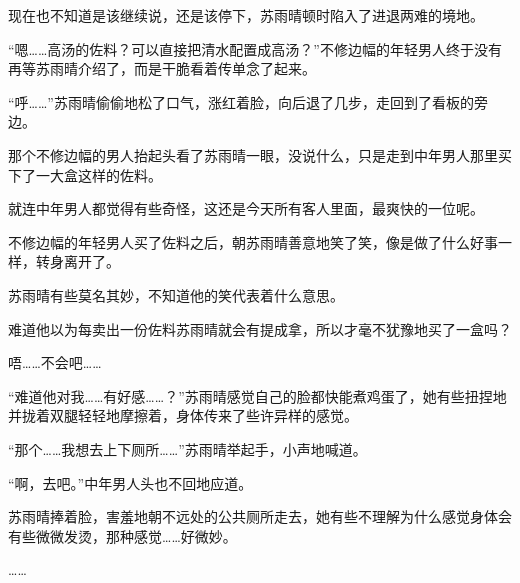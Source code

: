 现在也不知道是该继续说，还是该停下，苏雨晴顿时陷入了进退两难的境地。

“嗯……高汤的佐料？可以直接把清水配置成高汤？”不修边幅的年轻男人终于没有再等苏雨晴介绍了，而是干脆看着传单念了起来。

“呼……”苏雨晴偷偷地松了口气，涨红着脸，向后退了几步，走回到了看板的旁边。

那个不修边幅的男人抬起头看了苏雨晴一眼，没说什么，只是走到中年男人那里买下了一大盒这样的佐料。

就连中年男人都觉得有些奇怪，这还是今天所有客人里面，最爽快的一位呢。

不修边幅的年轻男人买了佐料之后，朝苏雨晴善意地笑了笑，像是做了什么好事一样，转身离开了。

苏雨晴有些莫名其妙，不知道他的笑代表着什么意思。

难道他以为每卖出一份佐料苏雨晴就会有提成拿，所以才毫不犹豫地买了一盒吗？

唔……不会吧……

“难道他对我……有好感……？”苏雨晴感觉自己的脸都快能煮鸡蛋了，她有些扭捏地并拢着双腿轻轻地摩擦着，身体传来了些许异样的感觉。

“那个……我想去上下厕所……”苏雨晴举起手，小声地喊道。

“啊，去吧。”中年男人头也不回地应道。

苏雨晴捧着脸，害羞地朝不远处的公共厕所走去，她有些不理解为什么感觉身体会有些微微发烫，那种感觉……好微妙。

……
